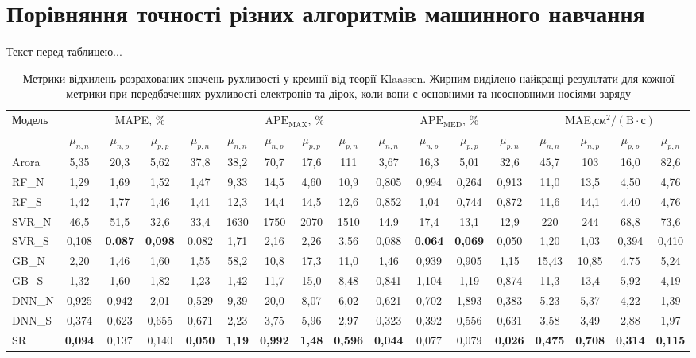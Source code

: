 \documentclass[10pt,a5paper,titlepage,oneside]{book}
\numberwithin{equation}{part}
\begin{document}
\section{Порівняння точності різних алгоритмів машинного навчання}


Текст перед таблицею...

\begin{landscape}

\vspace{15mm}

\begin{table}[htbp]
\setlength{\tabcolsep}{1.5pt}
\renewcommand{\arraystretch}{1.5}
\centering
\caption{Метрики відхилень розрахованих значень рухливості у кремнії від теорії Klaassen.
Жирним виділено найкращі результати для кожної метрики при передбаченнях рухливості електронів та дірок, коли вони є основними та неосновними носіями заряду}
\begin{tabular}{|l|c|c|c|c|c|c|c|c|c|c|c|c|c|c|c|c|}
\hline
\multirow{2}{*}{Модель}&\multicolumn{4}{c|}{MAPE, \%}&\multicolumn{4}{c|}{$\mathrm{APE}_\mathrm{MAX}$, \%}
   &\multicolumn{4}{c|}{$\mathrm{APE}_\mathrm{MED}$, \%}&\multicolumn{4}{c|}{MAE,$\text{см}^2/(\text{B}\cdot\text{с})$}\\
\cline{2-17}
&$\mu_{n,n}$&$\mu_{n,p}$&$\mu_{p,p}$&$\mu_{p,n}$&$\mu_{n,n}$&$\mu_{n,p}$&$\mu_{p,p}$&$\mu_{p,n}$
&$\mu_{n,n}$&$\mu_{n,p}$&$\mu_{p,p}$&$\mu_{p,n}$&$\mu_{n,n}$&$\mu_{n,p}$&$\mu_{p,p}$&$\mu_{p,n}$\\
\hline
Arora \cite{Arora1982}&5,35&20,3&5,62&37,8&38,2&70,7&17,6&111&3,67&16,3&5,01&32,6&45,7&103&16,0&82,6\\
\hline
RF\_N &1,29&1,69&1,52&1,47&9,33&14,5&4,60&10,9&0,805&0,994&0,264&0,913&11,0&13,5&4,50&4,76\\
\hline
RF\_S&1,42&1,77&1,46&1,41&12,3&14,4&14,5&12,6&0,852&1,04&0,744&0,872&11,6&14,1&4,40&4,76\\
\hline
SVR\_N&46,5&51,5&32,6&33,4&1630&1750&2070&1510&14,9&17,4&13,1&12,9&220&244&68,8&73,6\\
\hline
SVR\_S&0,108&\textbf{0,087}&\textbf{0,098}&0,082&1,71&2,16&2,26&3,56&0,088&\textbf{0,064}&\textbf{0,069}&0,050&1,20&1,03&0,394&0,410\\
\hline
GB\_N&2,20&1,46&1,60&1,55&58,2&10,8&17,3&11,0&1,46&0,939&0,905&1,15&15,43&10,85&4,75&5,24\\
\hline
GB\_S&1,32&1,60&1,82&1,23&1,42&11,7&15,0&8,48&0,841&1,104&1,19&0,874&11,3&13,4&5,92&4,19\\
\hline
DNN\_N&0,925&0,942&2,01&0,529&9,39&20,0&8,07&6,02&0,621&0,702&1,893&0,383&5,23&5,37&4,22&1,39\\
\hline
DNN\_S&0,374&0,623&0,655&0,671&2,23&3,75&5,96&2,97&0,323&0,392&0,556&0,631&3,58&3,49&2,88&1,97\\
\hline
SR&\textbf{0,094}&0,137&0,140&\textbf{0,050}&\textbf{1,19}&\textbf{0,992}&\textbf{1,48}&\textbf{0,596}&\textbf{0,044}&0,077&0,079&\textbf{0,026}&\textbf{0,475}
   &\textbf{0,708}&\textbf{0,314}&\textbf{0,115}\\
\hline
\end{tabular}
\end{table}
\end{landscape}
\end{document}

